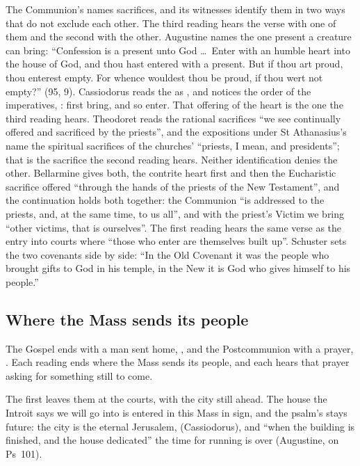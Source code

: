 The Communion's  names sacrifices, and its witnesses
identify them in two ways that do not exclude each other. The third reading
hears the verse with one of them and the second with the other. Augustine names the one present a creature can bring: ``Confession is a present
unto God \dots\ Enter with an humble heart into the house of God, and thou hast
entered with a present. But if thou art proud, thou enterest empty. For whence
wouldest thou be proud, if thou wert not empty?'' (95, 9). Cassiodorus reads
the  as , and notices the order of the imperatives,
: first bring, and so enter.
That offering of the heart is the one the third reading hears. Theodoret reads
the rational sacrifices ``we see continually offered and sacrificed by the
priests'', and the expositions under St Athanasius's name the spiritual
sacrifices of the churches' ``priests, I mean, and presidents''; that is the
sacrifice the second reading hears. Neither identification denies the other.
Bellarmine gives both, the contrite heart first and then the Eucharistic
sacrifice offered ``through the hands of the priests of the New Testament'',
and the continuation holds both together: the Communion ``is addressed to the priests, and, at
the same time, to us all'', and with the priest's Victim we bring ``other
victims, that is ourselves''. The first reading hears the same verse as the
entry into courts where ``those who enter are themselves built up''. Schuster
sets the two covenants side by side: ``In the Old Covenant it was the people who
brought gifts to God in his temple, in the New it is God who gives himself to
his people.''

\subsection{Where the Mass sends its people}

The Gospel ends with a man sent home, , and the
Postcommunion with a prayer, . Each reading ends where the Mass sends its people, and each hears
that prayer asking for something still to come.

The first leaves them at the courts, with the city still ahead. The house the
Introit says we will go into is entered in this Mass in sign, and the psalm's
 stays future: the city is the eternal Jerusalem,  (Cassiodorus), and ``when the building is finished,
and the house dedicated'' the time for running is over (Augustine, on
Ps~101).


